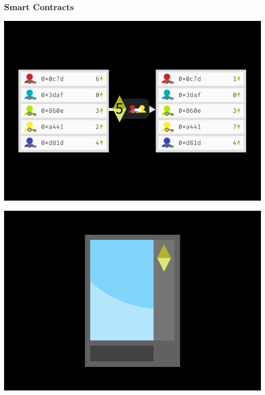 \documentclass[xcolor=x11names,compress]{beamer}
\begin{document}
\begin{frame}
	\frametitle{Smart Contracts}

	\begin{overprint}
		\begin{center}
			\includegraphics[width=\textwidth,height=0.8\textheight,keepaspectratio]{img/state/02.pdf}
		\end{center}
		\begin{center}
			\includegraphics[width=\textwidth,height=0.8\textheight,keepaspectratio]{img/state/07.pdf}
		\end{center}
		\begin{center}

\end{center}
\end{overprint}
\end{frame}
\end{document}
